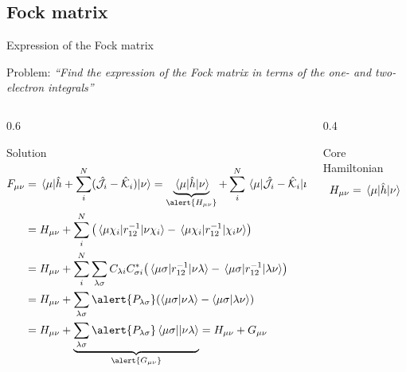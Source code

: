\documentclass[aspectratio=169,9pt]{beamer}
\newcommand{\hh}{\Hat{h}}
\newcommand{\chJ}{\Hat{\mathcal{J}}}
\newcommand{\chK}{\Hat{\mathcal{K}}}
\newcommand{\violet}[1]{\textcolor{hfViolet}{#1}}
\begin{document}
\subsection{Fock matrix}
\begin{frame}{Expression of the Fock matrix}
	\small
	\begin{block}{Problem:}
		\violet{\textit{``Find the expression of the Fock matrix in terms of the one- and two-electron integrals''}}
	\end{block}
	\pause
	\begin{columns}
		\begin{column}{0.6\textwidth}
        	\begin{block}{Solution}
            	\begin{equation*}
            		\begin{split}
            			F_{\mu \nu} 
            			& = \mel{\mu}{\hh + \sum_i^N (\chJ_i - \chK_i)}{\nu} 
            			= \underbrace{\mel{\mu}{\hh}{\nu}}_{\alert{H_{\mu\nu}}} +  \sum_i^N \mel{\mu}{\chJ_i - \chK_i}{\nu}
            			\\
            			& = H_{\mu\nu} + \sum_i^N \qty(\mel{\mu\chi_i}{r_{12}^{-1}}{\nu\chi_i} - \mel{\mu\chi_i}{r_{12}^{-1}}{\chi_i \nu})
            			\\
            			& = H_{\mu\nu} + \sum_i^N \sum_{\lambda\sigma} C_{\lambda i} C_{\sigma i}^* \qty(\mel{\mu\sigma}{r_{12}^{-1}}{\nu\lambda} - \mel{\mu\sigma}{r_{12}^{-1}}{\lambda\nu})
            			\\
            			& = H_{\mu\nu} + \sum_{\lambda\sigma} \alert{P_{\lambda\sigma}} \qty(\braket{\mu\sigma}{\nu\lambda} - \braket{\mu\sigma}{\lambda\nu})
            			\\
    					& = H_{\mu\nu} + \underbrace{\sum_{\lambda\sigma} \alert{P_{\lambda\sigma}} \mel{\mu\sigma}{}{\nu\lambda}}_{\alert{G_{\mu\nu}}}
            			= H_{\mu\nu} + G_{\mu\nu}
            		\end{split}
            	\end{equation*}
        	\end{block}
		\end{column}
		\begin{column}{0.4\textwidth}
        	\begin{block}{Core Hamiltonian}
            	\begin{equation*}
            		H_{\mu\nu} = \mel{\mu}{\hh}{\nu}
            	\end{equation*}
        	\end{block}

\end{column}
\end{columns}
\end{frame}
\end{document}
